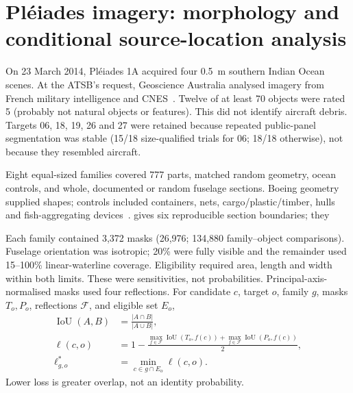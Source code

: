 \section{Pl\'eiades imagery: morphology and conditional source-location analysis}
\label{sec:pleiades-conditional}

On 23 March 2014, Pl\'eiades 1A acquired four 0.5~m southern
Indian Ocean scenes. At the ATSB's request, Geoscience Australia analysed
imagery from French military intelligence and CNES~\citep{minchin2017pleiades}.
Twelve of at least 70 objects were rated 5 (probably not natural objects or
features). This did not identify aircraft debris. Targets 06, 18, 19, 26 and
27 were retained because repeated public-panel segmentation was stable (15/18
size-qualified trials for 06; 18/18 otherwise), not because they resembled aircraft.

Eight equal-sized families covered 777 parts, matched random geometry, ocean
controls, and whole, documented or random fuselage sections. Boeing
geometry~\citep{boeing2024acap} supplied shapes; controls included containers,
nets, cargo/plastic/timber, hulls and fish-aggregating
devices~\citep{hapag2016container,iotc2023observer,lebreton2018plastic}.
\citet{murphy2013structures} gives six reproducible section boundaries; they

Each family contained 3,372 masks (26,976; 134,880 family--object
comparisons). Fuselage orientation was isotropic; 20\% were fully visible and
the remainder used 15--100\% linear-waterline coverage. Eligibility required
area, length and width within both limits. These were sensitivities, not
probabilities. Principal-axis-normalised masks used four reflections. For
candidate $c$, target $o$, family $g$, masks $T_o,P_o$, reflections
$\mathcal F$, and eligible set $E_o$,
\begin{equation}
\begin{aligned}
  \operatorname{IoU}(A,B)
    &=\frac{|A\cap B|}{|A\cup B|},\\
  \ell(c,o)
    &=1-\frac{
      \max_{f\in\mathcal F}\operatorname{IoU}(T_o,f(c))+
      \max_{f\in\mathcal F}\operatorname{IoU}(P_o,f(c))
    }{2},\\
  \ell^{*}_{g,o}
    &=\min_{c\in g\cap E_o}\ell(c,o).
\end{aligned}
\label{eq:pleiades-mask-loss}
\end{equation}
Lower loss is greater overlap, not an identity probability.


